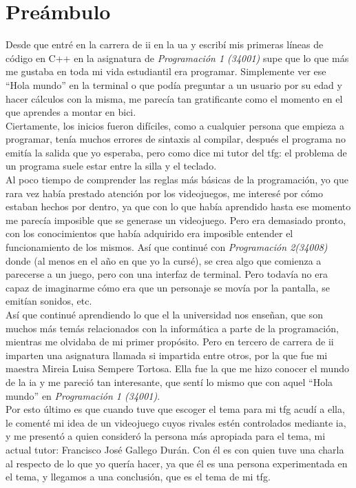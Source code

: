 
\chapter*{Preámbulo}
\thispagestyle{empty}
Desde que entré en la carrera de \gls{ii} en la \gls{ua} y escribí mis primeras líneas de código en C++ en la asignatura de \textit{Programación 1 (34001)} supe que lo que más me gustaba en toda mi vida estudiantil era programar. Simplemente ver ese ``Hola mundo'' en la terminal o que podía preguntar a un usuario por su edad y hacer cálculos con la misma, me parecía tan gratificante como el momento en el que aprendes a montar en bici.
\\
Ciertamente, los inicios fueron difíciles, como a cualquier persona que empieza a programar, tenía muchos errores de sintaxis al compilar, después el programa no emitía la salida que yo esperaba, pero como dice mi tutor del \gls{tfg}: el problema de un programa suele estar entre la silla y el teclado.
\\
Al poco tiempo de comprender las reglas más básicas de la programación, yo que rara vez había prestado atención por los videojuegos, me interesé por cómo estaban hechos por dentro, ya que con lo que había aprendido hasta ese momento me parecía imposible que se generase un videojuego. Pero era demasiado pronto, con los conocimientos que había adquirido era imposible entender el funcionamiento de los mismos. Así que continué con \textit{Programación 2(34008)} donde (al menos en el año en que yo la cursé), se crea algo que comienza a parecerse a un juego, pero con una interfaz de terminal. Pero todavía no era capaz de imaginarme cómo era que un personaje se movía por la pantalla, se emitían sonidos, etc.
\\
Así que continué aprendiendo lo que el la universidad nos enseñan, que son muchos más temás relacionados con la informática a parte de la programación, mientras me olvidaba de mi primer propósito. Pero en tercero de carrera de \gls{ii} imparten una asignatura llamada \gls{si} impartida entre otros, por la que fue mi maestra Mireia Luisa Sempere Tortosa. Ella fue la que me hizo conocer el mundo de la \gls{ia} y me pareció tan interesante, que sentí lo mismo que con aquel ``Hola mundo'' en \textit{Programación 1 (34001)}.
\\
Por esto último es que cuando tuve que escoger el tema para mi \gls{tfg} acudí a ella, le comenté mi idea de un videojuego cuyos rivales estén controlados mediante \gls{ia}, y me presentó a quien consideró la persona más apropiada para el tema, mi actual tutor: Francisco José Gallego Durán. Con él es con quien tuve una charla al respecto de lo que yo quería hacer, ya que él es una persona experimentada en el tema, y llegamos a una conclusión, que es el tema de mi \gls{tfg}.


